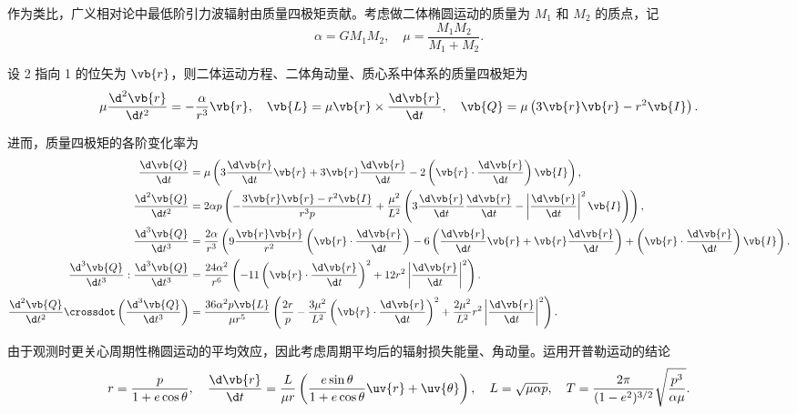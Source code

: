 \begin{notes}
作为类比，广义相对论中最低阶引力波辐射由质量四极矩贡献。考虑做二体椭圆运动的质量为 \(M_1\) 和 \(M_2\) 的质点，记
\begin{equation*}
	\alpha = G M_1 M_2, \quad \mu = \frac{M_1 M_2}{M_1 + M_2}.
\end{equation*}

设 2 指向 1 的位矢为 \(\vb{r}\)，则二体运动方程、二体角动量、质心系中体系的质量四极矩为
\begin{equation*}
	\mu \frac{\d^2\vb{r}}{\d t^2} = -\frac{\alpha}{r^3}\vb{r}, \quad \vb{L} = \mu \vb{r} \times \frac{\d \vb{r}}{\d t}, \quad \vb{Q} = \mu \left( 3\vb{r}\vb{r} - r^2 \vb{I} \right).
\end{equation*}

进而，质量四极矩的各阶变化率为
\begin{equation*}
	\begin{aligned}
	\frac{\d \vb{Q}}{\d t} &= \mu \left( 3\frac{\d \vb{r}}{\d t}\vb{r} + 3\vb{r}\frac{\d \vb{r}}{\d t} - 2\left( \vb{r} \cdot \frac{\d \vb{r}}{\d t} \right)\vb{I} \right), \\
	\frac{\d^2\vb{Q}}{\d t^2} &= 2\alpha p \left( -\frac{3\vb{r}\vb{r} - r^2 \vb{I}}{r^3 p} + \frac{\mu^2}{L^2} \left( 3\frac{\d \vb{r}}{\d t}\frac{\d \vb{r}}{\d t} - \left| \frac{\d \vb{r}}{\d t} \right|^2 \vb{I} \right) \right), \\
	\frac{\d^3\vb{Q}}{\d t^3} &= \frac{2\alpha}{r^3} \left( 9\frac{\vb{r}\vb{r}}{r^2} \left( \vb{r} \cdot \frac{\d \vb{r}}{\d t} \right) - 6\left( \frac{\d \vb{r}}{\d t}\vb{r} + \vb{r}\frac{\d \vb{r}}{\d t} \right) + \left( \vb{r} \cdot \frac{\d \vb{r}}{\d t} \right)\vb{I} \right).\\
	\frac{\d^3\vb{Q}}{\d t^3} : \frac{\d^3\vb{Q}}{\d t^3} &= \frac{24\alpha^2}{r^6} \left( -11\left( \vb{r} \cdot \frac{\d \vb{r}}{\d t} \right)^2 + 12 r^2 \left| \frac{\d \vb{r}}{\d t} \right|^2 \right).\\
	\frac{\d^2\vb{Q}}{\d t^2} \crossdot \left( \frac{\d^3\vb{Q}}{\d t^3} \right) &= \frac{36\alpha^2 p \vb{L}}{\mu r^5} \left( \frac{2r}{p} - \frac{3\mu^2}{L^2} \left( \vb{r} \cdot \frac{\d \vb{r}}{\d t} \right)^2 + \frac{2\mu^2}{L^2} r^2 \left| \frac{\d \vb{r}}{\d t} \right|^2 \right).
	\end{aligned}
\end{equation*}

由于观测时更关心周期性椭圆运动的平均效应，因此考虑周期平均后的辐射损失能量、角动量。运用开普勒运动的结论
\begin{equation*}
	r = \frac{p}{1 + e\cos\theta}, \quad \frac{\d \vb{r}}{\d t} = \frac{L}{\mu r} \left( \frac{e\sin\theta}{1 + e\cos\theta}\uv{r} + \uv{\theta} \right), \quad L = \sqrt{\mu\alpha p}, \quad T = \frac{2\pi}{(1 - e^2)^{3/2}} \sqrt{\frac{p^3}{\alpha\mu}}.
\end{equation*}


\end{notes}
